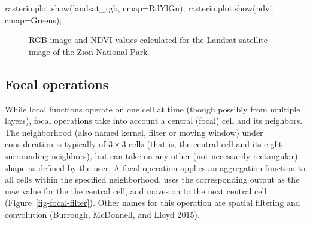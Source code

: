 \documentclass[
  letterpaper,
]{krantz}
\newenvironment{Shaded}{\begin{snugshade}}{\end{snugshade}}
\newcommand{\NormalTok}[1]{\textcolor[rgb]{0.00,0.23,0.31}{#1}}
\newcommand{\OperatorTok}[1]{\textcolor[rgb]{0.37,0.37,0.37}{#1}}
\newcommand{\StringTok}[1]{\textcolor[rgb]{0.13,0.47,0.30}{#1}}
\begin{document}
\begin{Shaded}
\begin{Highlighting}[]
\NormalTok{rasterio.plot.show(landsat\_rgb, cmap}\OperatorTok{=}\StringTok{\textquotesingle{}RdYlGn\textquotesingle{}}\NormalTok{)}\OperatorTok{;}
\NormalTok{rasterio.plot.show(ndvi, cmap}\OperatorTok{=}\StringTok{\textquotesingle{}Greens\textquotesingle{}}\NormalTok{)}\OperatorTok{;}
\end{Highlighting}
\end{Shaded}

\begin{figure}

\begin{minipage}{0.50\linewidth}



\end{minipage}%
%
\begin{minipage}{0.50\linewidth}



\end{minipage}%

\caption{\label{fig-raster-ndvi}RGB image and NDVI values calculated for
the Landsat satellite image of the Zion National Park}

\end{figure}%

\subsection{Focal operations}\label{sec-focal-operations}

While local functions operate on one cell at time (though possibly from
multiple layers), focal operations take into account a central (focal)
cell and its neighbors. The neighborhood (also named kernel, filter or
moving window) under consideration is typically of \(3 \times 3\) cells
(that is, the central cell and its eight surrounding neighbors), but can
take on any other (not necessarily rectangular) shape as defined by the
user. A focal operation applies an aggregation function to all cells
within the specified neighborhood, uses the corresponding output as the
new value for the the central cell, and moves on to the next central
cell (Figure~\ref{fig-focal-filter}). Other names for this operation are
spatial filtering and convolution (Burrough, McDonnell, and Lloyd 2015).
\end{document}
